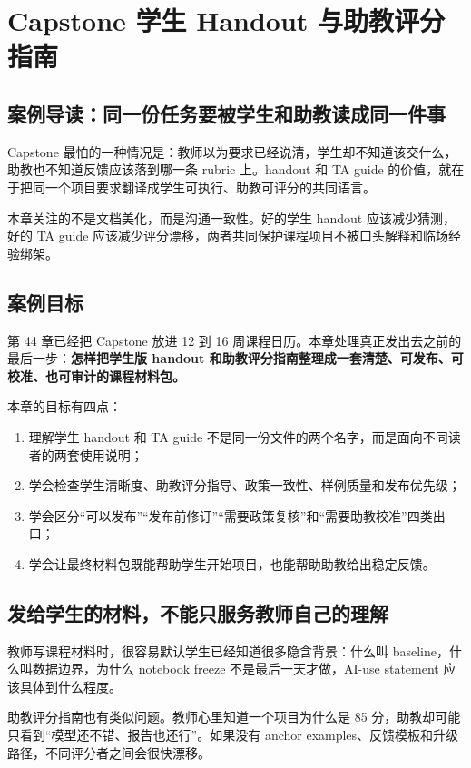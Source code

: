 \chapter{Capstone 学生 Handout 与助教评分指南}

\section{案例导读：同一份任务要被学生和助教读成同一件事}

Capstone 最怕的一种情况是：教师以为要求已经说清，学生却不知道该交什么，助教也不知道反馈应该落到哪一条 rubric 上。handout 和 TA guide 的价值，就在于把同一个项目要求翻译成学生可执行、助教可评分的共同语言。

本章关注的不是文档美化，而是沟通一致性。好的学生 handout 应该减少猜测，好的 TA guide 应该减少评分漂移，两者共同保护课程项目不被口头解释和临场经验绑架。

\section{案例目标}

第 44 章已经把 Capstone 放进 12 到 16 周课程日历。本章处理真正发出去之前的最后一步：\textbf{怎样把学生版 handout 和助教评分指南整理成一套清楚、可发布、可校准、也可审计的课程材料包。}

本章的目标有四点：

\begin{enumerate}
    \item 理解学生 handout 和 TA guide 不是同一份文件的两个名字，而是面向不同读者的两套使用说明；
    \item 学会检查学生清晰度、助教评分指导、政策一致性、样例质量和发布优先级；
    \item 学会区分“可以发布”“发布前修订”“需要政策复核”和“需要助教校准”四类出口；
    \item 学会让最终材料包既能帮助学生开始项目，也能帮助助教给出稳定反馈。
\end{enumerate}

\section{发给学生的材料，不能只服务教师自己的理解}

教师写课程材料时，很容易默认学生已经知道很多隐含背景：什么叫 baseline，什么叫数据边界，为什么 notebook freeze 不是最后一天才做，AI-use statement 应该具体到什么程度。

助教评分指南也有类似问题。教师心里知道一个项目为什么是 85 分，助教却可能只看到“模型还不错、报告也还行”。如果没有 anchor examples、反馈模板和升级路径，不同评分者之间会很快漂移。

